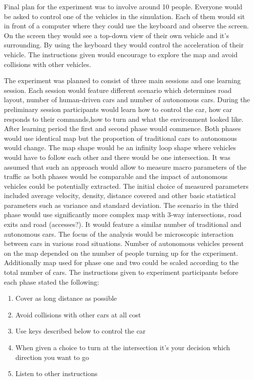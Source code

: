 \documentclass[11pt,english]{article}
\begin{document}

Final plan for the experiment was to involve around 10 people. Everyone would be asked to control one of the vehicles in the simulation. Each of them would sit in front of a computer where they could use the keyboard and observe the screen. On the screen they would see a top-down view of their own vehicle and it's surrounding. By using the keyboard they would control the acceleration of their vehicle. The instructions given would encourage to explore the map and avoid collisions with other vehicles.

The experiment was planned to consist of three main sessions and one learning session. Each session would feature different scenario which determines road layout, number of human-driven cars and number of autonomous cars. During the preliminary session participants would learn how to control the car, how car responds to their commands,how to turn and what the environment looked like. 
After learning period the first and second phase would commence. Both phases would use identical map but the proportion of traditional cars to autonomous would change. The map shape would be an infinity loop shape where vehicles would have to follow each other and there would be one intersection. It was assumed that such an approach would allow to measure macro parameters of the traffic as both phases would be comparable and the impact of autonomous vehicles could be potentially extracted. The initial choice of measured parameters included average velocity, density, distance covered and other basic statistical parameters such as variance and standard deviation. The scenario in the third phase would use significantly more complex map with 3-way  intersections, road exits and road (accesses?). It would feature a similar number of traditional and autonomous cars. The focus of the analysis would be microscopic interaction between cars in various road situations. 
Number of autonomous vehicles present on the map depended on the number of people turning up for the experiment. Additionally map used for phase one and two could be scaled according to the total number of cars. The instructions given to experiment participants before each phase stated the following:

\begin{enumerate}
  \item Cover as long distance as possible
  \item Avoid collisions with other cars at all cost
  \item Use keys described below to control the car
  \item When given a choice to turn at the intersection it's your decision which direction you want to go
  \item Listen to other instructions
\end{enumerate}
\end{document}
